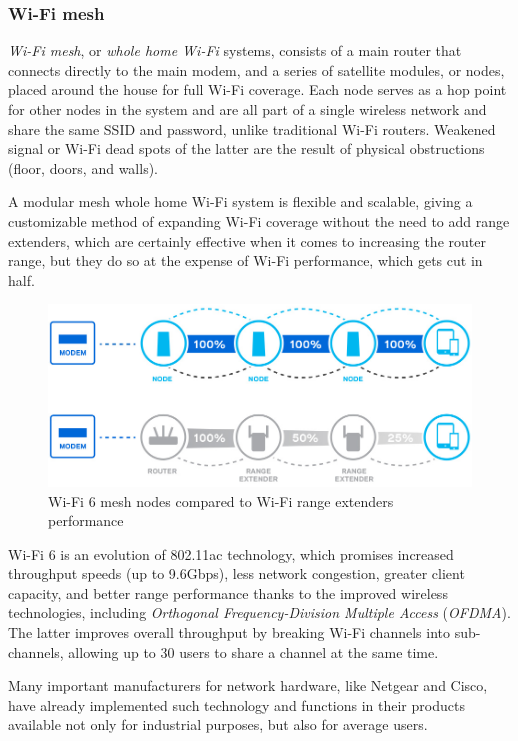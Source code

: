 			\subsubsection{Wi-Fi mesh}
					
				\textit{Wi-Fi mesh}, or \textit{whole home Wi-Fi} systems, consists of a main router that connects directly to the main modem, and a series of satellite modules, or nodes, placed around the house for full Wi-Fi coverage.
				Each node serves as a hop point for other nodes in the system and are all part of a single wireless network and share the same SSID and password, unlike traditional Wi-Fi routers.
				Weakened signal or Wi-Fi dead spots of the latter are the result of physical obstructions (floor, doors, and walls).
				
				A modular mesh whole home Wi-Fi system is flexible and scalable, giving a customizable method of expanding Wi-Fi coverage without the need to add range extenders, which are certainly effective when it comes to increasing the router range, but they do so at the expense of Wi-Fi performance, which gets cut in half.
			
				\begin{figure}
					\centering
					\includegraphics[width=.9\textwidth]{resources/img/chap4/wifi6}
					\caption{Wi-Fi 6 mesh nodes compared to Wi-Fi range extenders performance}
					\label{img:Wi-Fi6}
				\end{figure}
				
				Wi-Fi 6 is an evolution of 802.11ac technology, which promises increased throughput speeds (up to 9.6Gbps), less network congestion, greater client capacity, and better range performance thanks to the improved wireless technologies, including \textit{Orthogonal Frequency-Division Multiple Access} (\textit{OFDMA}).
				The latter improves overall throughput by breaking Wi-Fi channels into sub-channels, allowing up to 30 users to share a channel at the same time.
				
				Many important manufacturers for network hardware, like Netgear and Cisco, have already implemented such technology and functions in their products available not only for industrial purposes, but also for average users.
				